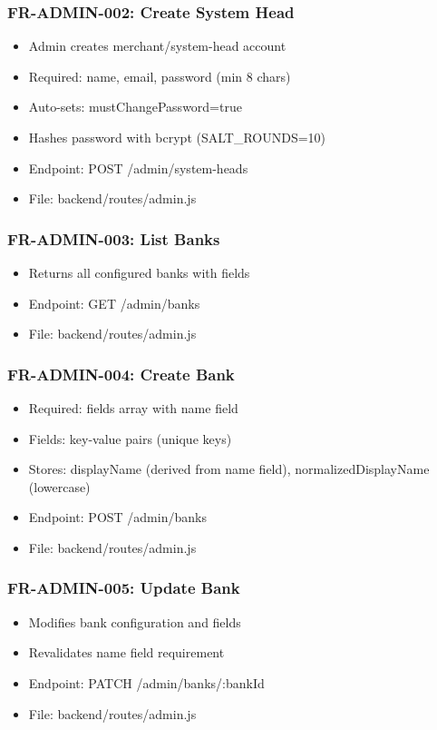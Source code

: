 \documentclass[12pt,a4paper]{article}
\begin{document}
\subsubsection{FR-ADMIN-002: Create System Head}
\begin{itemize}
  \item Admin creates merchant/system-head account
  \item Required: name, email, password (min 8 chars)
  \item Auto-sets: mustChangePassword=true
  \item Hashes password with bcrypt (SALT\_ROUNDS=10)
  \item Endpoint: POST /admin/system-heads
  \item File: backend/routes/admin.js
\end{itemize}

\subsubsection{FR-ADMIN-003: List Banks}
\begin{itemize}
  \item Returns all configured banks with fields
  \item Endpoint: GET /admin/banks
  \item File: backend/routes/admin.js
\end{itemize}

\subsubsection{FR-ADMIN-004: Create Bank}
\begin{itemize}
  \item Required: fields array with name field
  \item Fields: key-value pairs (unique keys)
  \item Stores: displayName (derived from name field), normalizedDisplayName (lowercase)
  \item Endpoint: POST /admin/banks
  \item File: backend/routes/admin.js
\end{itemize}

\subsubsection{FR-ADMIN-005: Update Bank}
\begin{itemize}
  \item Modifies bank configuration and fields
  \item Revalidates name field requirement
  \item Endpoint: PATCH /admin/banks/:bankId
  \item File: backend/routes/admin.js
\end{itemize}
\end{document}

